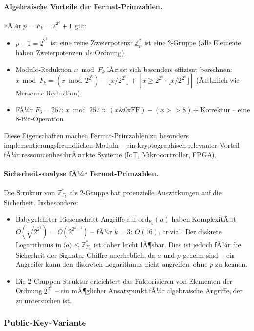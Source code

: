 ﻿\documentclass[a4paper,12pt]{scrreprt}
\theoremstyle{definition}
\begin{document}
\paragraph{Algebraische Vorteile der Fermat-Primzahlen.}
FÃ¼r $p = F_k = 2^{2^k}+1$ gilt:
\begin{itemize}
  \item $p - 1 = 2^{2^k}$ ist eine reine Zweierpotenz: $\mathbb{Z}_p^*$ ist eine 2-Gruppe (alle Elemente haben Zweierpotenzen als Ordnung).
  \item Modulo-Reduktion $x \bmod F_k$ lÃ¤sst sich besonders effizient berechnen: $x \bmod F_k = (x \bmod 2^{2^k}) - \lfloor x / 2^{2^k} \rfloor + [x \geq 2^{2^k} \cdot \lfloor x / 2^{2^k}\rfloor]$ (Ã¤hnlich wie Mersenne-Reduktion).
  \item FÃ¼r $F_3 = 257$: $x \bmod 257 \approx (x \& 0\mathrm{xFF}) - (x >> 8) + \mathrm{Korrektur}$ -- eine 8-Bit-Operation.
\end{itemize}

Diese Eigenschaften machen Fermat-Primzahlen zu besonders implementierungsfreundlichen Moduln -- ein kryptographisch relevanter Vorteil fÃ¼r ressourcenbeschrÃ¤nkte Systeme (IoT, Mikrocontroller, FPGA).

\paragraph{Sicherheitsanalyse fÃ¼r Fermat-Primzahlen.}
Die Struktur von $\mathbb{Z}_{F_k}^*$ als 2-Gruppe hat potenzielle Auswirkungen auf die Sicherheit. Insbesondere:
\begin{itemize}
  \item Babygelehrter-Riesenschritt-Angriffe auf $\mathrm{ord}_{F_k}(a)$ haben KomplexitÃ¤t $O(\sqrt{2^{2^k}}) = O(2^{2^{k-1}})$ -- fÃ¼r $k=3$: $O(16)$, trivial. Der diskrete Logarithmus in $\langle a \rangle \leq \mathbb{Z}_{F_3}^*$ ist daher leicht lÃ¶sbar. Dies ist jedoch fÃ¼r die Sicherheit der Signatur-Chiffre unerheblich, da $a$ und $p$ geheim sind -- ein Angreifer kann den diskreten Logarithmus nicht angreifen, ohne $p$ zu kennen.
  \item Die 2-Gruppen-Struktur erleichtert das Faktorisieren von Elementen der Ordnung $2^{2^k}$ -- ein mÃ¶glicher Ansatzpunkt fÃ¼r algebraische Angriffe, der zu untersuchen ist.
\end{itemize}

\subsubsection{Public-Key-Variante}
\end{document}

